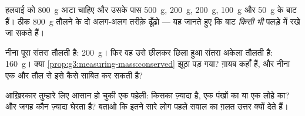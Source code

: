 \begin{exercise}[$\star$]\label{exo:g3:measuring-mass:9}
हलवाई को \qty{800}{g} आटा चाहिए और उसके पास \qty{500}{g},
\qty{200}{g}, \qty{200}{g}, \qty{100}{g} और \qty{50}{g} के बाट
हैं। ठीक \qty{800}{g} तौलने के दो अलग-अलग तरीक़े ढूँढ़ो --- यह जानते
हुए कि बाट \emph{किसी भी} पलड़े में रखे जा सकते हैं।
\end{exercise}

\begin{exercise}[$\star\star$]\label{exo:g3:measuring-mass:10}
नीना पूरा संतरा तौलती है: \qty{200}{g}। फिर वह उसे छीलकर छिला हुआ
संतरा अकेला तौलती है: \qty{160}{g}। क्या
\cref{prop:g3:measuring-mass:conserved} झूठा पड़ गया? ग़ायब 
कहाँ हैं, और नीना एक और तौल से इसे कैसे साबित कर सकती है?
\end{exercise}

\begin{exercise}[$\star\star$]\label{exo:g3:measuring-mass:11}
आख़िरकार तुम्हारे लिए आसान हो चुकी एक पहेली:  किसका ज़्यादा
है, एक  पंखों का या एक  लोहे का? और जगह कौन
ज़्यादा घेरता है? बताओ कि इतने सारे लोग पहले सवाल का ग़लत उत्तर
क्यों देते हैं।
\end{exercise}
